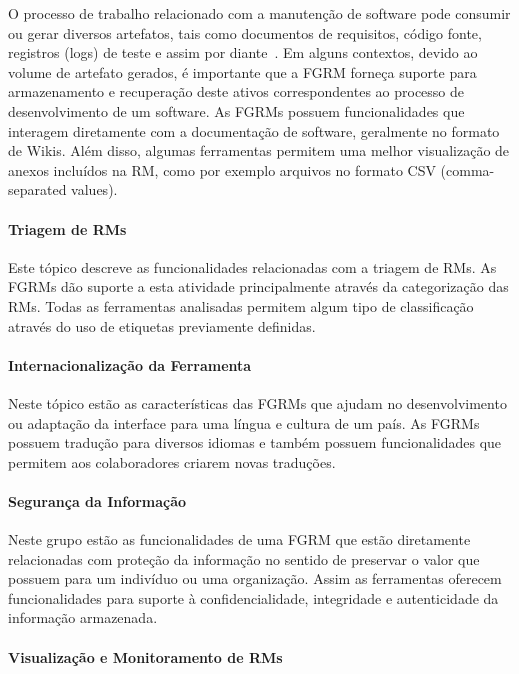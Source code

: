 O processo de trabalho relacionado com a manutenção de software pode consumir ou
gerar diversos artefatos, tais como documentos de requisitos, código fonte,
registros (logs) de teste e assim por diante~\cite{cavalcanti2013bug}. Em alguns
contextos, devido ao volume de artefato gerados, é importante que a FGRM forneça
suporte para armazenamento e recuperação deste ativos correspondentes ao
processo de desenvolvimento de um software. As FGRMs possuem funcionalidades que
interagem diretamente com a documentação de software, geralmente no formato de
Wikis. Além disso, algumas ferramentas permitem uma melhor visualização de
anexos incluídos na RM, como por exemplo arquivos no formato CSV
(comma-separated values).

\paragraph{Triagem de RMs}
\label{par:triagem_de_rm_s}

Este tópico descreve as funcionalidades relacionadas com a triagem de RMs. As
FGRMs dão suporte a esta atividade principalmente através da categorização das
RMs. Todas as ferramentas analisadas permitem algum tipo de classificação
através do uso de etiquetas previamente definidas.

\paragraph{Internacionalização da Ferramenta}
\label{par:internacionalização_da_ferramenta}

Neste tópico estão as características das FGRMs que ajudam no desenvolvimento ou
adaptação da interface para uma língua e cultura de um país. As FGRMs possuem
tradução para diversos idiomas e também possuem funcionalidades que permitem aos
colaboradores criarem novas traduções.

\paragraph{Segurança da Informação}
\label{par:segurança_da_informação}

Neste grupo estão as funcionalidades de uma FGRM que estão diretamente
relacionadas com proteção da informação no sentido de preservar o valor que
possuem para um indivíduo ou uma organização. Assim as ferramentas oferecem
funcionalidades para suporte à confidencialidade, integridade e autenticidade da
informação armazenada.

\paragraph{Visualização e Monitoramento de RMs}
\label{par:visualização_de_rm_s}

